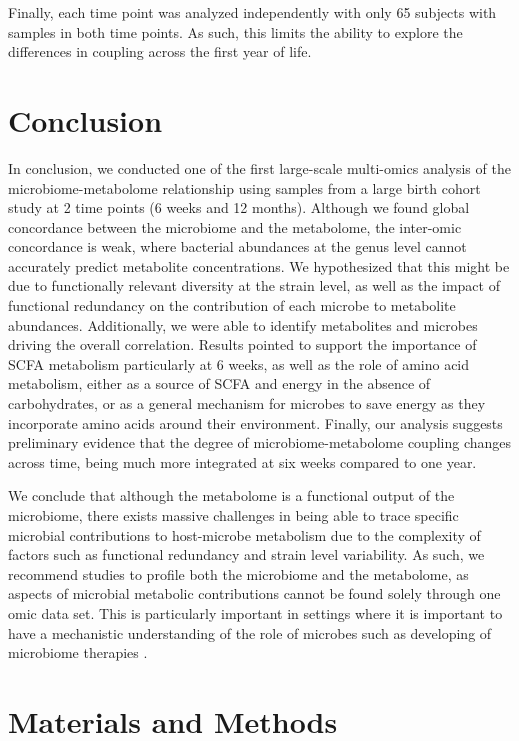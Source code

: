 Finally, each time point was analyzed independently with only 65 subjects with samples in both time points. As such, this limits the ability to explore the differences in coupling across the first year of life. 

\section{Conclusion}
In conclusion, we conducted one of the first large-scale multi-omics analysis of the microbiome-metabolome relationship using samples from a large birth cohort study at 2 time points (6 weeks and 12 months). Although we found global concordance between the microbiome and the metabolome, the inter-omic concordance is weak, where bacterial abundances at the genus level cannot accurately predict metabolite concentrations. We hypothesized that this might be due to functionally relevant diversity at the strain level, as well as the impact of functional redundancy on the contribution of each microbe to metabolite abundances. Additionally, we were able to identify metabolites and microbes driving the overall correlation. Results pointed to support the importance of SCFA metabolism particularly at 6 weeks, as well as the role of amino acid metabolism, either as a source of SCFA and energy in the absence of carbohydrates, or as a general mechanism for microbes to save energy as they incorporate amino acids around their environment. Finally, our analysis suggests preliminary evidence that the degree of microbiome-metabolome coupling changes across time, being much more integrated at six weeks compared to one year.  

We conclude that although the metabolome is a functional output of the microbiome, there exists massive challenges in being able to trace specific microbial contributions to host-microbe metabolism due to the complexity of factors such as functional redundancy and strain level variability. As such, we recommend studies to profile both the microbiome and the metabolome, as aspects of microbial metabolic contributions cannot be found solely through one omic data set. This is particularly important in settings where it is important to have a mechanistic understanding of the role of microbes such as developing of microbiome therapies \cite{lemon2012microbiotatargeted}.   

\section{Materials and Methods} \label{ch2_methods}

